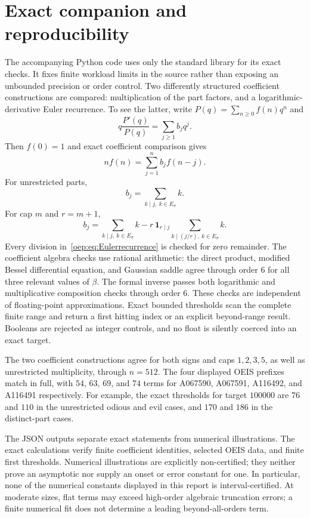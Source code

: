 \documentclass[11pt,letterpaper]{article}
\theoremstyle{remark}\newtheorem{remark}[theorem]{Remark}
\begin{document}
\section{Exact companion and reproducibility}\label{oep:sec:companion}
The accompanying Python code uses only the standard library for its exact checks. It fixes finite workload limits in the source rather than exposing an unbounded precision or order control. Two differently structured coefficient constructions are compared: multiplication of the part factors, and a logarithmic-derivative Euler recurrence. To see the latter, write $P(q)=\sum_{n\geq0}f(n)q^n$ and
\[
 q\frac{P'(q)}{P(q)}=\sum_{j\geq1}b_jq^j.
\]
Then $f(0)=1$ and exact coefficient comparison gives
\begin{equation}\label{oep:eq:Eulerrecurrence}
 n f(n)=\sum_{j=1}^{n}b_j f(n-j).
\end{equation}
For unrestricted parts,
\[
 b_j=\sum_{k\mid j,\ k\in E_\sigma}k.
\]
For cap $m$ and $r=m+1$,
\begin{equation}\label{oep:eq:cappedb}
 b_j=\sum_{k\mid j,\ k\in E_\sigma}k
       -r\,\mathbf1_{r\mid j}\sum_{k\mid(j/r),\ k\in E_\sigma}k.
\end{equation}
Every division in~\eqref{oep:eq:Eulerrecurrence} is checked for zero remainder. The coefficient algebra checks use rational arithmetic: the direct product, modified Bessel differential equation, and Gaussian saddle agree through order $6$ for all three relevant values of $\beta$. The formal inverse passes both logarithmic and multiplicative composition checks through order $6$. These checks are independent of floating-point approximations. Exact bounded thresholds scan the complete finite range and return a first hitting index or an explicit beyond-range result. Booleans are rejected as integer controls, and no float is silently coerced into an exact target.

The two coefficient constructions agree for both signs and caps $1,2,3,5$, as well as unrestricted multiplicity, through $n=512$. The four displayed OEIS prefixes match in full, with $54$, $63$, $69$, and $74$ terms for A067590, A067591, A116492, and A116491 respectively. For example, the exact thresholds for target $100000$ are $76$ and $110$ in the unrestricted odious and evil cases, and $170$ and $186$ in the distinct-part cases.

The JSON outputs separate exact statements from numerical illustrations. The exact calculations verify finite coefficient identities, selected OEIS data, and finite first thresholds. Numerical illustrations are explicitly non-certified; they neither prove an asymptotic nor supply an onset or error constant for one. In particular, none of the numerical constants displayed in this report is interval-certified. At moderate sizes, flat terms may exceed high-order algebraic truncation errors; a finite numerical fit does not determine a leading beyond-all-orders term.
\end{document}
